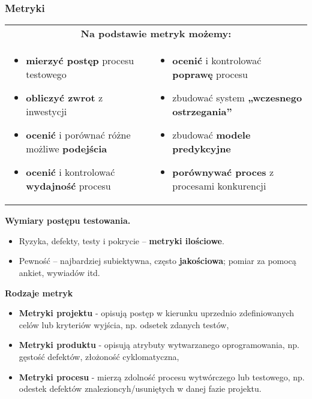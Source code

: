 \documentclass[../main.tex]{subfiles}
\begin{document}
    \subsubsection{Metryki}
    \begin{table}[H]
        \begin{center}
            \begin{tabular}{p{8cm} p{8cm}}
                \multicolumn{2}{c}{\textbf{ Na podstawie metryk możemy:}} \\
                \begin{itemize}
                    \item \textbf{mierzyć postęp} procesu testowego
                    \item \textbf{obliczyć zwrot} z inwestycji
                    \item \textbf{ocenić} i porównać różne możliwe \textbf{podejścia}
                    \item \textbf{ocenić} i kontrolować \textbf{wydajność} procesu
                \end{itemize}
                &
                \begin{itemize}
                    \item \textbf{ocenić} i kontrolować \textbf{poprawę} procesu
                    \item zbudować system \textbf{„wczesnego ostrzegania”}
                    \item zbudować \textbf{modele predykcyjne}
                    \item \textbf{porównywać proces} z procesami konkurencji
                \end{itemize} \\
            \end{tabular}
        \end{center}
    \end{table}

    \textbf{Wymiary postępu testowania.}
    \begin{itemize}
        \item Ryzyka, defekty, testy i pokrycie – \textbf{metryki ilościowe}.
        \item Pewność – najbardziej subiektywna, często \textbf{jakościowa}; pomiar za pomocą ankiet, wywiadów itd.
    \end{itemize}

    \textbf{Rodzaje metryk}
    \begin{itemize}
        \item \textbf{Metryki projektu} - opisują postęp w kierunku uprzednio zdefiniowanych celów lub kryteriów
        wyjścia, np. odsetek zdanych testów,
        \item \textbf{Metryki produktu} - opisują atrybuty wytwarzanego oprogramowania, np. gęstość defektów, złożoność cyklomatyczna,
        \item \textbf{Metryki procesu} - mierzą zdolność procesu wytwórczego lub testowego, np. odestek defektów znalezioncyh/usuniętych
        w danej fazie projektu.
    \end{itemize}
\end{document}
